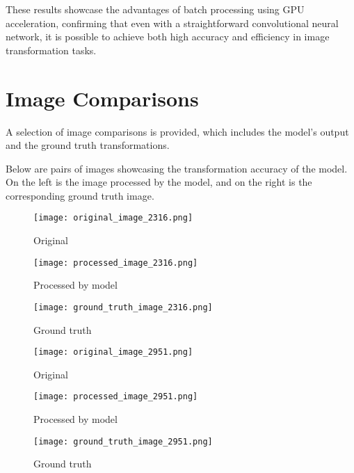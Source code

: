 \documentclass[12pt, a4paper]{article}
\begin{document}
These results showcase the advantages of batch processing using GPU acceleration, confirming that even with a straightforward convolutional neural network, it is possible to achieve both high accuracy and efficiency in image transformation tasks.

\section{Image Comparisons}
A selection of image comparisons is provided, which includes the model's output and the ground truth transformations.

Below are pairs of images showcasing the transformation accuracy of the model. On the left is the image processed by the model, and on the right is the corresponding ground truth image.

\begin{figure}[ht]
  \centering
  \begin{minipage}[b]{0.3\textwidth}
    \texttt{[image: original\_image\_2316.png]}
    \caption{Original}
    \label{fig:original_1}
  \end{minipage}
  \hfill
  \begin{minipage}[b]{0.3\textwidth}
    \texttt{[image: processed\_image\_2316.png]}
    \caption{Processed by model}
    \label{fig:processed_1}
  \end{minipage}
  \hfill
  \begin{minipage}[b]{0.3\textwidth}
    \texttt{[image: ground\_truth\_image\_2316.png]}
    \caption{Ground truth}
    \label{fig:ground_truth_1}
  \end{minipage}
\end{figure}

\begin{figure}[ht]
  \centering
  \begin{minipage}[b]{0.3\textwidth}
    \texttt{[image: original\_image\_2951.png]}
    \caption{Original}
    \label{fig:original_2}
  \end{minipage}
  \hfill
  \begin{minipage}[b]{0.3\textwidth}
    \texttt{[image: processed\_image\_2951.png]}
    \caption{Processed by model}
    \label{fig:processed_2}
  \end{minipage}
  \hfill
  \begin{minipage}[b]{0.3\textwidth}
    \texttt{[image: ground\_truth\_image\_2951.png]}
    \caption{Ground truth}
    \label{fig:ground_truth_2}
  \end{minipage}
\end{figure}
\end{document}
